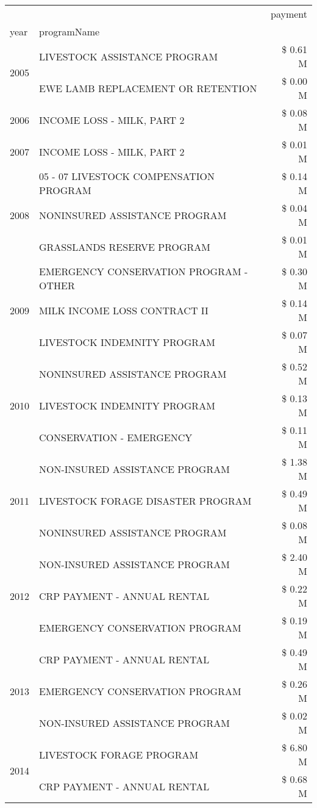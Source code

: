 \begin{tabular}{llr}
\toprule
 &  & payment \\
year & programName &  \\
\midrule
\multirow[t]{2}{*}{2005} & LIVESTOCK ASSISTANCE PROGRAM & \$ 0.61 M \\
 & EWE LAMB REPLACEMENT OR RETENTION & \$ 0.00 M \\
\cline{1-3}
2006 & INCOME LOSS - MILK, PART 2 & \$ 0.08 M \\
\cline{1-3}
2007 & INCOME LOSS - MILK, PART 2 & \$ 0.01 M \\
\cline{1-3}
\multirow[t]{3}{*}{2008} & 05 - 07 LIVESTOCK COMPENSATION PROGRAM & \$ 0.14 M \\
 & NONINSURED ASSISTANCE PROGRAM & \$ 0.04 M \\
 & GRASSLANDS RESERVE PROGRAM & \$ 0.01 M \\
\cline{1-3}
\multirow[t]{3}{*}{2009} & EMERGENCY CONSERVATION PROGRAM - OTHER & \$ 0.30 M \\
 & MILK INCOME LOSS CONTRACT II & \$ 0.14 M \\
 & LIVESTOCK INDEMNITY PROGRAM & \$ 0.07 M \\
\cline{1-3}
\multirow[t]{3}{*}{2010} & NONINSURED ASSISTANCE PROGRAM & \$ 0.52 M \\
 & LIVESTOCK INDEMNITY PROGRAM & \$ 0.13 M \\
 & CONSERVATION - EMERGENCY & \$ 0.11 M \\
\cline{1-3}
\multirow[t]{3}{*}{2011} & NON-INSURED ASSISTANCE PROGRAM & \$ 1.38 M \\
 & LIVESTOCK FORAGE DISASTER PROGRAM & \$ 0.49 M \\
 & NONINSURED ASSISTANCE PROGRAM & \$ 0.08 M \\
\cline{1-3}
\multirow[t]{3}{*}{2012} & NON-INSURED ASSISTANCE PROGRAM & \$ 2.40 M \\
 & CRP PAYMENT - ANNUAL RENTAL & \$ 0.22 M \\
 & EMERGENCY CONSERVATION PROGRAM & \$ 0.19 M \\
\cline{1-3}
\multirow[t]{3}{*}{2013} & CRP PAYMENT - ANNUAL RENTAL & \$ 0.49 M \\
 & EMERGENCY CONSERVATION PROGRAM & \$ 0.26 M \\
 & NON-INSURED ASSISTANCE PROGRAM & \$ 0.02 M \\
\cline{1-3}
\multirow[t]{3}{*}{2014} & LIVESTOCK FORAGE PROGRAM & \$ 6.80 M \\
 & CRP PAYMENT - ANNUAL RENTAL & \$ 0.68 M \\

\end{tabular}
